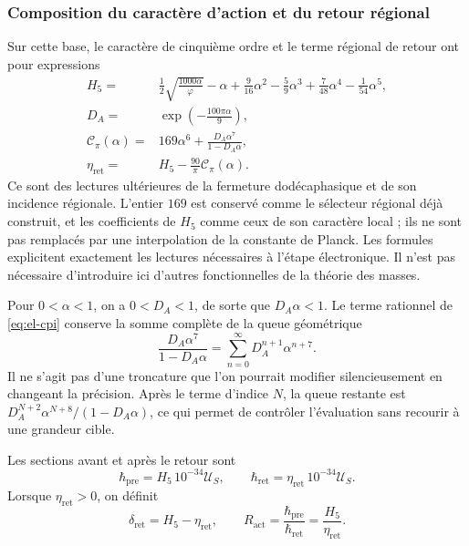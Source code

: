 

\subsubsection{Composition du caractère d'action et du retour régional}

Sur cette base, le caractère de cinquième ordre et le terme régional de
retour ont pour expressions
\begin{align}
 H_5={}&\frac12\sqrt{\frac{1000\alpha}{\varphi}}-\alpha
   +\frac9{16}\alpha^2-\frac59\alpha^3
   +\frac7{48}\alpha^4-\frac1{54}\alpha^5,
   \label{eq:el-h5}\\
 D_A={}&\exp\!\left(-\frac{100\pi\alpha}{9}\right),
   \label{eq:el-da}\\
 \mathcal C_\pi(\alpha)={}&169\alpha^6+
       \frac{D_A\alpha^7}{1-D_A\alpha},
   \label{eq:el-cpi}\\
 \eta_{\mathrm{ret}}={}&H_5-\frac{90}{\pi}\mathcal C_\pi(\alpha).
   \label{eq:el-eta}
\end{align}
Ce sont des lectures ultérieures de la fermeture dodécaphasique et de son
incidence régionale. L'entier \(169\) est conservé comme le sélecteur
régional déjà construit, et les coefficients de \(H_5\) comme ceux de son
caractère local ; ils ne sont pas remplacés par une interpolation de la constante de
Planck. Les formules explicitent exactement les lectures nécessaires
à l'étape électronique. Il n'est pas nécessaire d'introduire ici d'autres
fonctionnelles de la théorie des masses.

Pour \(0<\alpha<1\), on a \(0<D_A<1\), de sorte que
\(D_A\alpha<1\). Le terme rationnel de \eqref{eq:el-cpi} conserve la
somme complète de la queue géométrique
\begin{equation}
 \frac{D_A\alpha^7}{1-D_A\alpha}
 =\sum_{n=0}^{\infty}D_A^{n+1}\alpha^{n+7}.
 \label{eq:el-cola-regional}
\end{equation}
Il ne s'agit pas d'une troncature que l'on pourrait modifier silencieusement en changeant la
précision. Après le terme d'indice \(N\), la queue restante est
\(D_A^{N+2}\alpha^{N+8}/(1-D_A\alpha)\), ce qui permet de contrôler
l'évaluation sans recourir à une grandeur cible.

\begin{definition}
Les sections avant et après le retour sont
\begin{equation}
 \hbar_{\mathrm{pre}}=H_5\,10^{-34}\mathcal U_S,
 \qquad
 \hbar_{\mathrm{ret}}=\eta_{\mathrm{ret}}\,10^{-34}\mathcal U_S.
 \label{eq:el-secciones-accion}
\end{equation}
Lorsque \(\eta_{\mathrm{ret}}>0\), on définit
\begin{equation}
 \delta_{\mathrm{ret}}=H_5-\eta_{\mathrm{ret}},\qquad
 R_{\mathrm{act}}=\frac{\hbar_{\mathrm{pre}}}{\hbar_{\mathrm{ret}}}
 =\frac{H_5}{\eta_{\mathrm{ret}}}.
 \label{eq:el-ratio}
\end{equation}
\end{definition}

